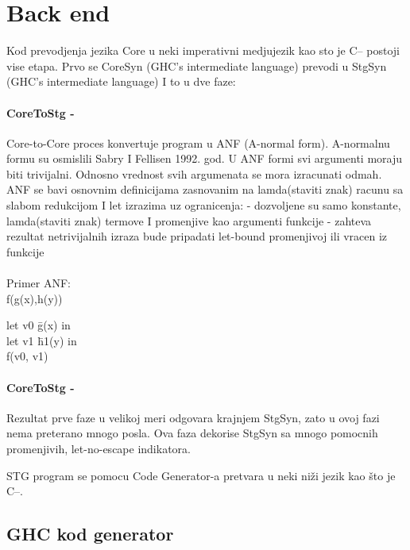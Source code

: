 \section{Back end}
\label{sec:backend}
\label{slike_i_tabele}


Kod prevodjenja jezika Core u neki imperativni medjujezik kao sto je C-- postoji vise etapa.
Prvo se CoreSyn (GHC’s intermediate language) prevodi u StgSyn (GHC’s intermediate language) I to u dve faze:


\paragraph{CoreToStg - }

Core-to-Core proces konvertuje program u ANF (A-normal form). A-normalnu formu su osmislili Sabry I Fellisen 1992. god.  U ANF formi svi argumenti moraju biti trivijalni. Odnosno  vrednost svih argumenata se mora izracunati odmah. ANF se bavi osnovnim definicijama zasnovanim na lamda(staviti znak) racunu sa slabom redukcijom I let izrazima uz ogranicenja:
- dozvoljene su samo konstante, lamda(staviti znak) termove I promenjive kao argumenti funkcije
- zahteva rezultat netrivijalnih izraza bude pripadati let-bound promenjivoj ili vracen iz funkcije \\ \\
Primer ANF: \\ f(g(x),h(y))\\

\begin{tabbing}
let v0 \= g(x) in \\
	\>let v1 \= h1(y) in \\
	\> \> f(v0, v1)
\end{tabbing}

\paragraph{CoreToStg - }

Rezultat prve faze u velikoj meri odgovara krajnjem StgSyn, zato u ovoj fazi nema preterano mnogo posla. Ova faza dekorise StgSyn sa mnogo pomocnih  promenjivih, let-no-escape indikatora.

STG program se pomocu  Code Generator-a pretvara u neki niži jezik kao što je C--.

\subsection{GHC kod generator}

